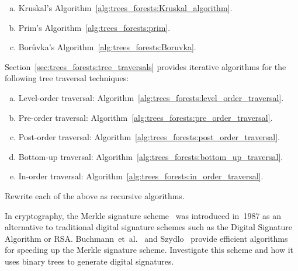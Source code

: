 \begin{problem}
\begin{enumerate}[(a)]
  \item Kruskal's
    Algorithm~\ref{alg:trees_forests:Kruskal_algorithm}.

  \item Prim's
    Algorithm~\ref{alg:trees_forests:prim}.

  \item Bor\r{u}vka's
    Algorithm~\ref{alg:trees_forests:Boruvka}.
  \end{enumerate}

\item Section~\ref{sec:trees_forests:tree_traversals} provides
  iterative algorithms for the following tree traversal techniques:
  \begin{enumerate}[(a)]
  \item Level-order traversal:
    Algorithm~\ref{alg:trees_forests:level_order_traversal}.

  \item Pre-order traversal:
    Algorithm~\ref{alg:trees_forests:pre_order_traversal}.

  \item Post-order traversal:
    Algorithm~\ref{alg:trees_forests:post_order_traversal}.

  \item Bottom-up traversal:
    Algorithm~\ref{alg:trees_forests:bottom_up_traversal}.

  \item In-order traversal:
    Algorithm~\ref{alg:trees_forests:in_order_traversal}.
  \end{enumerate}
  Rewrite each of the above as recursive
  algorithms.

\item In cryptography, the Merkle signature
  scheme~\cite{Merkle1987} was introduced in~1987 as an alternative to
  traditional digital signature schemes such as the Digital Signature
  Algorithm or RSA.
  Buchmann~et~al.~\cite{BuchmannEtAl2008} and Szydlo~\cite{Szydlo2004}
  provide efficient algorithms for speeding up the Merkle signature
  scheme. Investigate this scheme and how it uses binary trees to
  generate digital signatures.
\end{problem}
